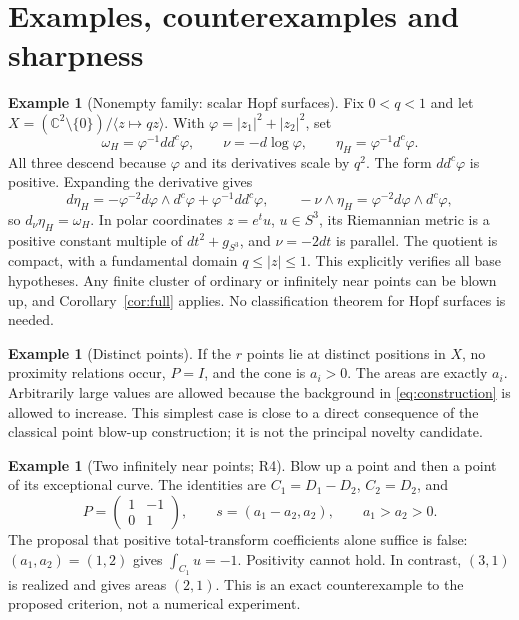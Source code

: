 \documentclass[12pt]{amsart}
\theoremstyle{definition}
\newtheorem{eg}[thm]{Example}
\theoremstyle{remark}
\numberwithin{equation}{section}
\newcommand{\C}{\mathbb{C}}
\begin{document}
\section{Examples, counterexamples and sharpness}\label{sec:examples}
\begin{eg}[Nonempty family: scalar Hopf surfaces]\label{ex:hopf}
Fix $0<q<1$ and let $X=(\C^2\setminus\{0\})/\langle z\mapsto qz\rangle$. With $\varphi=|z_1|^2+|z_2|^2$, set
\begin{equation}\label{eq:hopf}
 \omega_H=\varphi^{-1}dd^c\varphi,\qquad
 \nu=-d\log\varphi,\qquad \eta_H=\varphi^{-1}d^c\varphi.
\end{equation}
All three descend because $\varphi$ and its derivatives scale by $q^2$. The form $dd^c\varphi$ is positive. Expanding the derivative gives
\[
 d\eta_H=-\varphi^{-2}d\varphi\wedge d^c\varphi
              +\varphi^{-1}dd^c\varphi,\qquad
 -\nu\wedge\eta_H=\varphi^{-2}d\varphi\wedge d^c\varphi,
\]
so $d_\nu\eta_H=\omega_H$. In polar coordinates $z=e^t u$, $u\in S^3$, its Riemannian metric is a positive constant multiple of $dt^2+g_{S^3}$, and $\nu=-2dt$ is parallel. The quotient is compact, with a fundamental domain $q\leq|z|\leq1$. This explicitly verifies all base hypotheses. Any finite cluster of ordinary or infinitely near points can be blown up, and Corollary~\ref{cor:full} applies. No classification theorem for Hopf surfaces is needed.
\end{eg}

\begin{eg}[Distinct points]\label{ex:distinct}
If the $r$ points lie at distinct positions in $X$, no proximity relations occur, $P=I$, and the cone is $a_i>0$. The areas are exactly $a_i$. Arbitrarily large values are allowed because the background in \eqref{eq:construction} is allowed to increase. This simplest case is close to a direct consequence of the classical point blow-up construction; it is not the principal novelty candidate.
\end{eg}

\begin{eg}[Two infinitely near points; R4]\label{ex:two}
Blow up a point and then a point of its exceptional curve. The identities are $C_1=D_1-D_2$, $C_2=D_2$, and
\begin{equation}\label{eq:two}
 P=\begin{pmatrix}1&-1\\0&1\end{pmatrix},\qquad
 s=(a_1-a_2,a_2),\qquad a_1>a_2>0.
\end{equation}
The proposal that positive total-transform coefficients alone suffice is false: $(a_1,a_2)=(1,2)$ gives $\int_{C_1}u=-1$. Positivity cannot hold. In contrast, $(3,1)$ is realized and gives areas $(2,1)$. This is an exact counterexample to the proposed criterion, not a numerical experiment.
\end{eg}
\end{document}
